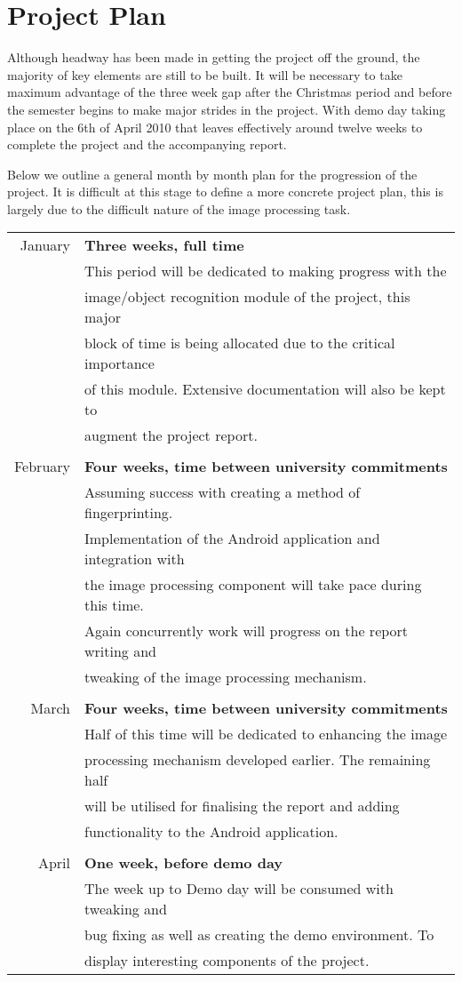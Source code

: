 \chapter{Project Plan}

Although headway has been made in getting the project off the ground, the majority of key elements are still to be built. It will be necessary to take maximum advantage of the three week gap after the Christmas period and before the semester begins to make major strides in the project. With demo day taking place on the 6th of April 2010 that leaves effectively around twelve weeks to complete the project and the accompanying report.

Below we outline a general month by month plan for the progression of the project. It is difficult at this stage to define a more concrete project plan, this is largely due to the difficult nature of the image processing task.

\begin{tabular*}{0.8\textwidth}{r l}
January & \bf{Three weeks, full time}\\
 & This period will be dedicated to making progress with the\\
 & image/object recognition module of the project, this major\\
 & block of time is being allocated due to the critical importance\\
 & of this module. Extensive documentation will also be kept to\\
 & augment the project report.\\
 & \\
February & \bf{Four weeks, time between university commitments}\\
 & Assuming success with creating a method of fingerprinting.\\
 & Implementation of the Android application and integration with\\
 & the image processing component will take pace during this time.\\
 & Again concurrently work will progress on the report writing and\\
 & tweaking of the image processing mechanism.\\
 & \\
March & \bf{Four weeks, time between university commitments}\\
 & Half of this time will be dedicated to enhancing the image\\
 & processing mechanism developed earlier. The remaining half\\
 & will be utilised for finalising the report and adding\\
 & functionality to the Android application.\\
 & \\
April & \bf{One week, before demo day}\\
 & The week up to Demo day will be consumed with tweaking and\\
 & bug fixing as well as creating the demo environment. To\\
 & display interesting components of the project.\\
\end{tabular*}
